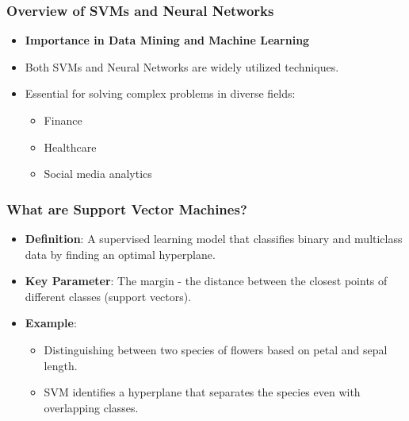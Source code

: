 \documentclass[aspectratio=169]{beamer}
\begin{document}
\frame{\titlepage}

\begin{frame}[fragile]
  \maketitle
\end{frame}

\begin{frame}[fragile]
  \frametitle{Overview of SVMs and Neural Networks}
  \begin{itemize}
    \item \textbf{Importance in Data Mining and Machine Learning}
    \item Both SVMs and Neural Networks are widely utilized techniques.
    \item Essential for solving complex problems in diverse fields:
      \begin{itemize}
        \item Finance
        \item Healthcare
        \item Social media analytics
      \end{itemize}
  \end{itemize}
\end{frame}

\begin{frame}[fragile]
  \frametitle{What are Support Vector Machines?}
  \begin{itemize}
    \item \textbf{Definition}: A supervised learning model that classifies binary and multiclass data by finding an optimal hyperplane.
    \item \textbf{Key Parameter}: The margin - the distance between the closest points of different classes (support vectors).
    \item \textbf{Example}: 
      \begin{itemize}
        \item Distinguishing between two species of flowers based on petal and sepal length.
        \item SVM identifies a hyperplane that separates the species even with overlapping classes.
      \end{itemize}
  \end{itemize}
\end{frame}
\end{document}
